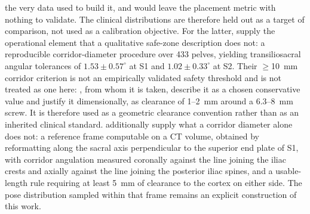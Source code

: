 \documentclass[9pt]{extarticle}
\begin{document}
the very data used to build it, and would leave the placement metric with nothing to validate. The clinical distributions are therefore held out as a target of comparison, not used as a calibration objective. For the latter, \citet{mclaren2021corridor} supply the operational element that a qualitative safe-zone description \citep{ramadanov2025safezone} does not: a reproducible corridor-diameter procedure over 433 pelves, yielding transiliosacral angular tolerances of $1.53 \pm 0.57^{\circ}$ at S1 and $1.02 \pm 0.33^{\circ}$ at S2. Their $\geq$10~mm corridor criterion is not an empirically validated safety threshold and is not treated as one here: \citet{kaiser2014dysmorphism}, from whom it is taken, describe it as a chosen conservative value and justify it dimensionally, as clearance of 1--2~mm around a 6.3--8~mm screw. It is therefore used as a geometric clearance convention rather than as an inherited clinical standard. \citet{kaiser2014dysmorphism} additionally supply what a corridor diameter alone does not: a reference frame computable on a CT volume, obtained by reformatting along the sacral axis perpendicular to the superior end plate of S1, with corridor angulation measured coronally against the line joining the iliac crests and axially against the line joining the posterior iliac spines, and a usable-length rule requiring at least 5~mm of clearance to the cortex on either side. The pose distribution sampled within that frame remains an explicit construction of this work.
\end{document}

